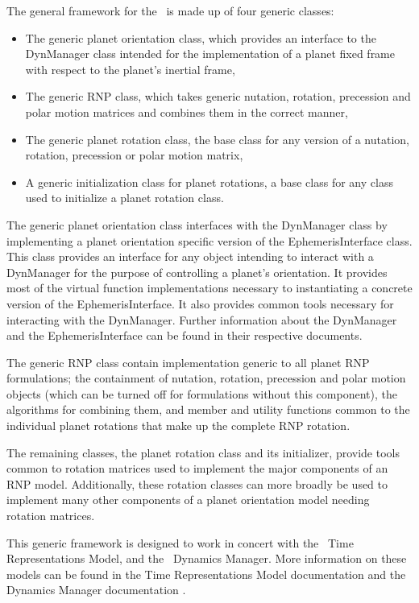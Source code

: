 The general framework for the \ModelDesc\ is made up of four generic classes:

\begin{itemize}
\item{The generic planet orientation class}, which provides an interface to
the DynManager class intended for the implementation of a planet fixed
frame with respect to the planet's inertial frame,
\item{The generic RNP class}, which takes generic nutation, rotation,
precession and polar motion matrices and combines them in the correct manner,
\item{The generic planet rotation class}, the base class for any version
of a nutation, rotation, precession or polar motion matrix,
\item{A generic initialization class for planet rotations}, a base class for
any class used to initialize a planet rotation class.
\end{itemize}

The generic planet orientation class interfaces with the DynManager class
by implementing a planet orientation specific version of the EphemerisInterface
class. This class provides an interface for any object intending to interact with a DynManager
for the purpose of controlling a planet's orientation. It provides most of the virtual
function implementations necessary to instantiating a concrete version of the EphemerisInterface.
It also provides common tools necessary for interacting with the DynManager. Further
information about the DynManager \cite{dynenv:DYNMANAGER} and the EphemerisInterface
\cite{dynenv:EPHEMERIDES} can be found in their respective documents.

The generic RNP class contain implementation generic to all planet RNP formulations;
the containment of nutation, rotation, precession and polar motion objects (which can
be turned off for formulations without this component),
the algorithms for combining them, and member and utility functions
common to the individual planet rotations that make up the complete RNP rotation.

The remaining classes, the planet rotation class and its initializer, provide
tools common to rotation matrices used to implement the major components
of an RNP model. Additionally, these rotation classes can more broadly be used
to implement many other components of a planet orientation model needing
rotation matrices.

This generic framework is designed to work in concert with the \JEODid\
Time Representations Model, and the \JEODid\ Dynamics Manager. More information on these
models can be found in the Time Representations Model documentation \cite{dynenv:TIME} and the
Dynamics Manager documentation \cite{dynenv:DYNMANAGER}.

